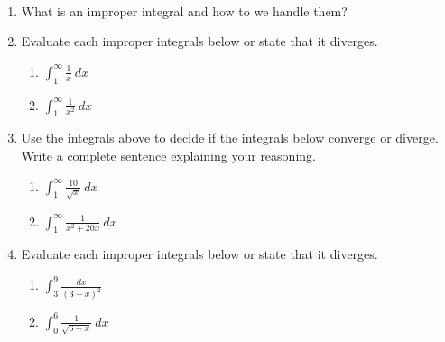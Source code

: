 \documentclass[11pt,fleqn]{article}
\begin{document}
\renewcommand{\headrulewidth}{0pt}
\newcommand{\blank}[1]{\rule{#1}{0.75pt}}
\newcommand{\bc}{\begin{center}}
\newcommand{\ec}{\end{center}}
\renewcommand{\d}{\displaystyle}

\vspace*{-0.7in}

\begin{center}
  \large
  \\
   
\end{center}

\begin{enumerate}
\item What is an improper integral and how to we handle them?
\vfill
\item Evaluate each improper integrals below or state that it diverges.
	\begin{enumerate}
	\item {\Large{$\displaystyle \int_1^\infty \frac{1}{x} \: dx$}}
	\vfill
	\item {\Large{$\displaystyle \int_1^\infty \frac{1}{x^2} \: dx$}}
	\vfill
	\end{enumerate}
\item Use the integrals above to decide if the integrals below converge or diverge. Write a complete sentence explaining your reasoning.
	\begin{enumerate}
	\item {\Large{$\displaystyle \int_1^\infty \frac{10}{\sqrt{x}} \: dx$}}
	\vspace{1in}
	\item {\Large{$\displaystyle \int_1^\infty \frac{1}{x^2+20x} \: dx$}}
	\vspace{1in}
	\end{enumerate}
\newpage
\item Evaluate each improper integrals below or state that it diverges.
	\begin{enumerate}
	\item {\Large{$\displaystyle \int_3^9 \frac{dx}{(3-x)^2}$}}
	\vfill
	\item {\Large{$\displaystyle \int_0^6 \frac{1}{\sqrt{6-x}} \: dx$}}
	\vfill
	\end{enumerate}
\end{enumerate}
\end{document}
